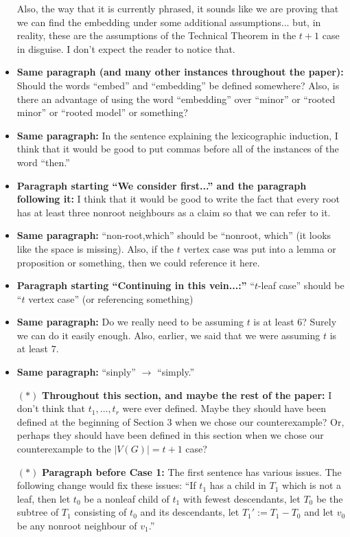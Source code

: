 \documentclass[11 pt]{article}
\theoremstyle{definition}
\theoremstyle{case}
\numberwithin{equation}{section}
\begin{document}
\begin{itemize}
Also, the way that it is currently phrased, it sounds like we are proving that we can find the embedding under some additional assumptions... but, in reality, these are the assumptions of the Technical Theorem in the $t+1$ case in disguise. I don't expect the reader to notice that.
\item \textbf{Same paragraph (and many other instances throughout the paper):} Should the words ``embed'' and ``embedding'' be defined somewhere? Also, is there an advantage of using the word ``embedding'' over ``minor'' or ``rooted minor'' or ``rooted model'' or something?
\item \textbf{Same paragraph:} In the sentence explaining the lexicographic induction, I think that it would be good to put commas before all of the instances of the word ``then.''
\item \textbf{Paragraph starting ``We consider first...'' and the paragraph following it:} I think that it would be good to write the fact that every root has at least three nonroot neighbours as a claim so that we can refer to it. 
\item \textbf{Same paragraph: } ``non-root,which'' should be ``nonroot, which'' (it looks like the space is missing). Also, if the $t$ vertex case was put into a lemma or proposition or something, then we could reference it here.
\item \textbf{Paragraph starting ``Continuing in this vein...:''} ``$t$-leaf case'' should be ``$t$ vertex case'' (or referencing something)
\item \textbf{Same paragraph:} Do we really need to be assuming $t$ is at least $6$? Surely we can do it easily enough. Also, earlier, we said that we were assuming $t$ is at least $7$. 
\item \textbf{Same paragraph:} ``sinply'' $\to$ ``simply.''
\item[$\boldsymbol{(*)}$] \textbf{Throughout this section, and maybe the rest of the paper:} I don't think that $t_1,\dots,t_r$ were ever defined. Maybe they should have been defined at the beginning of Section 3 when we chose our counterexample? Or, perhaps they should have been defined in this section when we chose our counterexample to the $|V(G)|=t+1$ case?
\item[$\boldsymbol{(*)}$] \textbf{Paragraph before Case 1:} The first sentence has various issues. The following change would fix these issues: ``If $t_1$ has a child in $T_1$ which is not a leaf, then let $t_0$ be a nonleaf child of $t_1$ with fewest descendants, let $T_0$ be the subtree of $T_1$ consisting of $t_0$ and its descendants, let $T_1':=T_1-T_0$ and let $v_0$ be any nonroot neighbour of $v_1$.''

\end{itemize}
\end{document}
